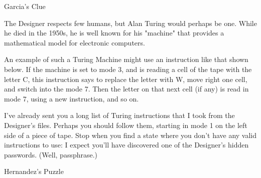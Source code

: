 \documentclass{article}
\begin{document}
\newpage

Garcia's Clue

The Designer respects few humans, but Alan Turing would
perhaps be one. While he died in the 1950s, he is well known
for his "machine" that provides a mathematical model for
electronic computers.

An example of such a Turing Machine might use an instruction
like that shown below. If the machine is set to mode 3,
and is reading a cell of the tape with the letter C,
this instruction says to replace the letter with W, move
right one cell, and switch into the mode 7. Then the letter
on that next cell (if any) is read in mode 7, using a new
instruction, and so on.

I've already sent you a long list of Turing instructions
that I took from the Designer's files. Perhaps
you should follow them, starting in mode 1 on the left side of
a piece of tape. Stop when you find a state where you don't
have any valid instructions to use: I expect you'll have
discovered one of the Designer's hidden passwords.
(Well, passphrase.)

\begin{center}
\end{center}


\newpage

Hernandez's Puzzle
\end{document}
